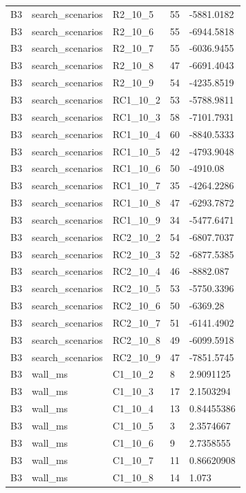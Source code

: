 \begin{longtable}{lllll}
B3 & search\_scenarios & R2\_10\_5 & 55 & -5881.0182 \\
B3 & search\_scenarios & R2\_10\_6 & 55 & -6944.5818 \\
B3 & search\_scenarios & R2\_10\_7 & 55 & -6036.9455 \\
B3 & search\_scenarios & R2\_10\_8 & 47 & -6691.4043 \\
B3 & search\_scenarios & R2\_10\_9 & 54 & -4235.8519 \\
B3 & search\_scenarios & RC1\_10\_2 & 53 & -5788.9811 \\
B3 & search\_scenarios & RC1\_10\_3 & 58 & -7101.7931 \\
B3 & search\_scenarios & RC1\_10\_4 & 60 & -8840.5333 \\
B3 & search\_scenarios & RC1\_10\_5 & 42 & -4793.9048 \\
B3 & search\_scenarios & RC1\_10\_6 & 50 & -4910.08 \\
B3 & search\_scenarios & RC1\_10\_7 & 35 & -4264.2286 \\
B3 & search\_scenarios & RC1\_10\_8 & 47 & -6293.7872 \\
B3 & search\_scenarios & RC1\_10\_9 & 34 & -5477.6471 \\
B3 & search\_scenarios & RC2\_10\_2 & 54 & -6807.7037 \\
B3 & search\_scenarios & RC2\_10\_3 & 52 & -6877.5385 \\
B3 & search\_scenarios & RC2\_10\_4 & 46 & -8882.087 \\
B3 & search\_scenarios & RC2\_10\_5 & 53 & -5750.3396 \\
B3 & search\_scenarios & RC2\_10\_6 & 50 & -6369.28 \\
B3 & search\_scenarios & RC2\_10\_7 & 51 & -6141.4902 \\
B3 & search\_scenarios & RC2\_10\_8 & 49 & -6099.5918 \\
B3 & search\_scenarios & RC2\_10\_9 & 47 & -7851.5745 \\
B3 & wall\_ms & C1\_10\_2 & 8 & 2.9091125 \\
B3 & wall\_ms & C1\_10\_3 & 17 & 2.1503294 \\
B3 & wall\_ms & C1\_10\_4 & 13 & 0.84455386 \\
B3 & wall\_ms & C1\_10\_5 & 3 & 2.3574667 \\
B3 & wall\_ms & C1\_10\_6 & 9 & 2.7358555 \\
B3 & wall\_ms & C1\_10\_7 & 11 & 0.86620908 \\
B3 & wall\_ms & C1\_10\_8 & 14 & 1.073 \\

\end{longtable}

